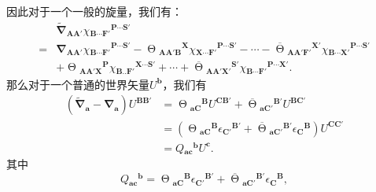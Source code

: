 因此对于一个一般的旋量，我们有：
\begin{equation*}
	\begin{aligned}
		& \tilde{\boldsymbol{\nabla }}_{\boldsymbol{AA} '} \chi {_{\boldsymbol{B} \cdots \boldsymbol{F} '}}^{\boldsymbol{P} \cdots \boldsymbol{S} '}\\
		= & \boldsymbol{\nabla }_{\boldsymbol{AA} '} \chi {_{\boldsymbol{B} \cdots \boldsymbol{F} '}}^{\boldsymbol{P} \cdots \boldsymbol{S} '} -\upTheta {_{\boldsymbol{AA} '\boldsymbol{B}}}^{\boldsymbol{X}} \chi {_{\boldsymbol{X} \cdots \boldsymbol{F} '}}^{\boldsymbol{P} \cdots \boldsymbol{S} '} -\cdots -\overline{\upTheta }{_{\boldsymbol{AA} '\boldsymbol{F} '}}^{\boldsymbol{X} '} \chi {_{\boldsymbol{B} \cdots \boldsymbol{X} '}}^{\boldsymbol{P} \cdots \boldsymbol{S} '}\\
		& +\upTheta {_{\boldsymbol{AA} '\boldsymbol{X}}}^{\boldsymbol{P}} \chi {_{\boldsymbol{B} ..\boldsymbol{F} '}}^{\boldsymbol{X} \cdots \boldsymbol{S} '} +\cdots +\overline{\upTheta }{_{\boldsymbol{AA} '\boldsymbol{X} '}}^{\boldsymbol{S} '} \chi {_{\boldsymbol{B} \cdots \boldsymbol{F} '}}^{\boldsymbol{P} \cdots \boldsymbol{X} '} .
	\end{aligned}
\end{equation*}
那么对于一个普通的世界矢量$U^{\boldsymbol{b}}$，我们有
\begin{equation*}
	\begin{aligned}
		(\tilde{\boldsymbol{\nabla }}_{\boldsymbol{a}} -\boldsymbol{\nabla }_{\boldsymbol{a}} )U^{\boldsymbol{BB} '} & =\upTheta {_{\boldsymbol{aC}}}^{\boldsymbol{B}} U^{\boldsymbol{CB} '} +\overline{\upTheta }{_{\boldsymbol{aC} '}}^{\boldsymbol{B} '} U^{\boldsymbol{BC} '}\\
		& =(\upTheta {_{\boldsymbol{aC}}}^{\boldsymbol{B}} \epsilon {_{\boldsymbol{C} '}}^{\boldsymbol{B} '} +\overline{\upTheta }{_{\boldsymbol{aC} '}}^{\boldsymbol{B} '} \epsilon {_{\boldsymbol{C}}}^{\boldsymbol{B}} )U^{\boldsymbol{CC} '}\\
		& =Q{_{\boldsymbol{ac}}}^{\boldsymbol{b}} U^{\boldsymbol{c}} .
	\end{aligned}
\end{equation*}
其中
\begin{equation}
	Q{_{\boldsymbol{ac}}}^{\boldsymbol{b}} =\upTheta {_{\boldsymbol{aC}}}^{\boldsymbol{B}} \epsilon {_{\boldsymbol{C} '}}^{\boldsymbol{B} '} +\overline{\upTheta }{_{\boldsymbol{aC} '}}^{\boldsymbol{B} '} \epsilon {_{\boldsymbol{C}}}^{\boldsymbol{B}} ,
	\label{eq:5.23}
\end{equation}
